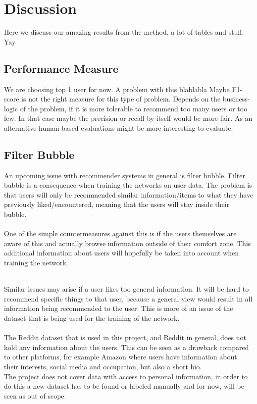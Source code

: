 \chapter{Discussion}

Here we discuss our amazing results from the method, a lot of tables and stuff. Yay


\section{Performance Measure}%
We are choosing top 1 user for now. A problem with this blablabla 
Maybe F1-score is not the right measure for this type of problem. Depends on the business-logic of the problem, if it is more tolerable to recommend too many users or too few. In that case maybe the precision or recall by itself would be more fair. 
As an alternative human-based evaluations might be more interesting to evaluate.

\section{Filter Bubble}
An upcoming issue with recommender systems in general is filter bubble.
Filter bubble is a consequence when training the networks on user data. The problem is that users will only be recommended similar information/items to what they have previously liked/encountered, meaning that the users will stay inside their bubble. 
\\\\
One of the simple countermeasures against this is if the users themselves are aware of this and actually browse information outside of their comfort zone. This additional information about users will hopefully be taken into account when training the network. 
\\\\

Similar issues may arise if a user likes too general information. It will be hard to recommend specific things to that user, because a general view would result in all information being recommended to the user. This is more of an issue of the dataset that is being used for the training of the network. 
\\\\
The Reddit dataset that is used in this project, and Reddit in general, does not hold any information about the users. This can be seen as a drawback compared to other platforms, for example Amazon where users have information about their interests, social media and occupation, but also a short bio. \\
The project does not cover data with access to personal information, in order to do this a new dataset has to be found or labeled manually and for now, will be seen as out of scope.

